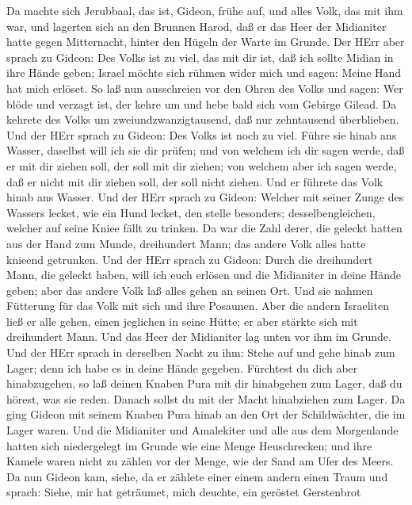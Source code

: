  Da machte sich Jerubbaal, das ist, Gideon, frühe auf, und
alles Volk, das mit ihm war, und lagerten sich an den Brunnen Harod, daß
er das Heer der Midianiter hatte gegen Mitternacht, hinter den Hügeln
der Warte im Grunde.  Der HErr aber sprach zu Gideon: Des
Volks ist zu viel, das mit dir ist, daß ich sollte Midian in ihre Hände
geben; Israel möchte sich rühmen wider mich und sagen: Meine Hand hat
mich erlöset.  So laß nun ausschreien vor den Ohren des
Volks und sagen: Wer blöde und verzagt ist, der kehre um und hebe bald
sich vom Gebirge Gilead. Da kehrete des Volks um zweiundzwanzigtausend,
daß nur zehntausend überblieben.  Und der HErr sprach zu
Gideon: Des Volks ist noch zu viel. Führe sie hinab ans Wasser, daselbst
will ich sie dir prüfen; und von welchem ich dir sagen werde, daß er mit
dir ziehen soll, der soll mit dir ziehen; von welchem aber ich sagen
werde, daß er nicht mit dir ziehen soll, der soll nicht ziehen.
 Und er führete das Volk hinab ans Wasser. Und der HErr
sprach zu Gideon: Welcher mit seiner Zunge des Wassers lecket, wie ein
Hund lecket, den stelle besonders; desselbengleichen, welcher auf seine
Kniee fällt zu trinken.  Da war die Zahl derer, die geleckt
hatten aus der Hand zum Munde, dreihundert Mann; das andere Volk alles
hatte knieend getrunken.  Und der HErr sprach zu Gideon:
Durch die dreihundert Mann, die geleckt haben, will ich euch erlösen und
die Midianiter in deine Hände geben; aber das andere Volk laß alles
gehen an seinen Ort.  Und sie nahmen Fütterung für das Volk
mit sich und ihre Posaunen. Aber die andern Israeliten ließ er alle
gehen, einen jeglichen in seine Hütte; er aber stärkte sich mit
dreihundert Mann. Und das Heer der Midianiter lag unten vor ihm im
Grunde.  Und der HErr sprach in derselben Nacht zu ihm:
Stehe auf und gehe hinab zum Lager; denn ich habe es in deine Hände
gegeben.  Fürchtest du dich aber hinabzugehen, so laß
deinen Knaben Pura mit dir hinabgehen zum Lager,  daß du
hörest, was sie reden. Danach sollst du mit der Macht hinabziehen zum
Lager. Da ging Gideon mit seinem Knaben Pura hinab an den Ort der
Schildwächter, die im Lager waren.  Und die Midianiter und
Amalekiter und alle aus dem Morgenlande hatten sich niedergelegt im
Grunde wie eine Menge Heuschrecken; und ihre Kamele waren nicht zu
zählen vor der Menge, wie der Sand am Ufer des Meers.  Da
nun Gideon kam, siehe, da er zählete einer einem andern einen Traum und
sprach: Siehe, mir hat geträumet, mich deuchte, ein geröstet Gerstenbrot
